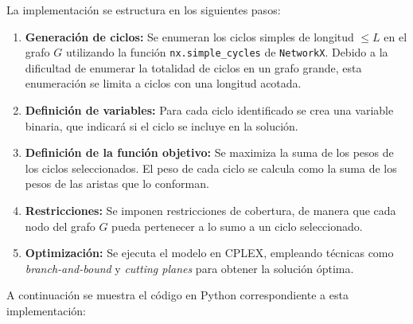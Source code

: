 \documentclass[twocolumn, fontsize=10pt]{article}
\begin{document}
La implementación se estructura en los siguientes pasos:

\begin{enumerate}
    \item \textbf{Generación de ciclos:} Se enumeran los ciclos simples de longitud \( \leq L \) en el grafo \( G \) utilizando la función \texttt{nx.simple\_cycles} de \texttt{NetworkX}. Debido a la dificultad de enumerar la totalidad de ciclos en un grafo grande, esta enumeración se limita a ciclos con una longitud acotada.
    \item \textbf{Definición de variables:} Para cada ciclo identificado se crea una variable binaria, que indicará si el ciclo se incluye en la solución.
    \item \textbf{Definición de la función objetivo:} Se maximiza la suma de los pesos de los ciclos seleccionados. El peso de cada ciclo se calcula como la suma de los pesos de las aristas que lo conforman.
    \item \textbf{Restricciones:} Se imponen restricciones de cobertura, de manera que cada nodo del grafo \( G \) pueda pertenecer a lo sumo a un ciclo seleccionado.
    \item \textbf{Optimización:} Se ejecuta el modelo en CPLEX, empleando técnicas como \textit{branch-and-bound} y \textit{cutting planes} para obtener la solución óptima.
\end{enumerate}

A continuación se muestra el código en Python correspondiente a esta implementación:
\end{document}
